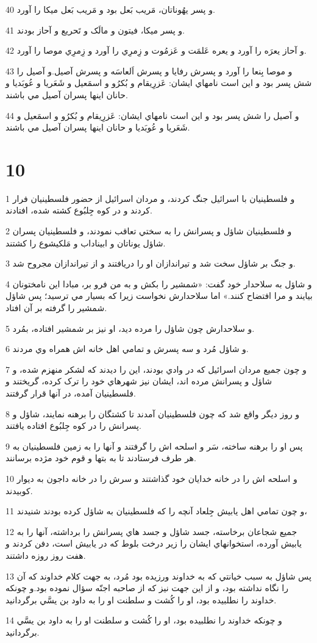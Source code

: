 \par 40 و پسر يهُوناتان، مَريب بَعل بود و مَريب بَعل ميکا را آورد.
\par 41 و پسر ميکا، فيتون و مالَک و تَحريع و آحاز بودند.
\par 42 و آحاز يعرَه را آورد و يعره عَلمَت و عَزمُوت و زِمرِي را آورد و زِمرِي موصا را آورد.
\par 43 و موصا بِنعا را آورد و پسرش رفايا و پسرش اَلعاسَه و پسرش آصيل.و آصيل را شش پسر بود و اين است نامهاي ايشان: عَزرِيقام و بُکرُو و اسمَعيل و شَعَريا و عُوبَديا و حانان اينها پسران آصيل مي باشند.
\par 44 و آصيل را شش پسر بود و اين است نامهاي ايشان: عَزرِيقام و بُکرُو و اسمَعيل و شَعَريا و عُوبَديا و حانان اينها پسران آصيل مي باشند.
 
\chapter{10}

\par 1 و فلسطينيان با اسرائيل جنگ کردند، و مردان اسرائيل از حضور فلسطينيان فرار کردند و در کوه جِلبُوع کشته شده، افتادند.
\par 2 و فلسطينيان شاؤل و پسرانش را به سختي تعاقب نمودند، و فلسطينيان پسران شاؤل يوناتان و ابيناداب و مَلکيشوع را کشتند.
\par 3 و جنگ بر شاؤل سخت شد و تيراندازان او را دريافتند و از تيراندازان مجروح شد.
\par 4 و شاؤل به سلاحدار خود گفت: «شمشير را بکش و به من فرو بر، مبادا اين نامختونان بيايند و مرا افتضاح کنند.» اما سلاحدارش نخواست زيرا که بسيار مي ترسيد؛ پس شاؤل شمشير را گرفته بر آن افتاد.
\par 5 و سلاحدارش چون شاؤل را مرده ديد، او نيز بر شمشير افتاده، بمُرد.
\par 6 و شاؤل مُرد و سه پسرش و تمامي اهل خانه اش همراه وي مردند.
\par 7 و چون جميع مردان اسرائيل که در وادي بودند، اين را ديدند که لشکر منهزم شده، و شاؤل و پسرانش مرده اند، ايشان نيز شهرهاي خود را ترک کرده، گريختند و فلسطينيان آمده، در آنها قرار گرفتند.
\par 8 و روز ديگر واقع شد که چون فلسطينيان آمدند تا کشتگان را برهنه نمايند، شاؤل و پسرانش را در کوه جِلبُوع افتاده يافتند.
\par 9 پس او را برهنه ساخته، سَر و اسلحه اش را گرفتند و آنها را به زمين فلسطينيان به هر طرف فرستادند تا به بتها و قوم خود مژده برسانند.
\par 10 و اسلحه اش را در خانه خدايان خود گذاشتند و سرش را در خانه داجون به ديوار کوبيدند.
\par 11 و چون تمامي اهل يابيش جِلعاد آنچه را که فلسطينيان به شاؤل کرده بودند شنيدند،
\par 12 جميع شجاعان برخاسته، جسد شاؤل و جسد هاي پسرانش را برداشته، آنها را به يابيش آورده، استخوانهاي ايشان را زير درخت بلوط که در يابيش است، دفن کردند و هفت روز روزه داشتند.
\par 13 پس شاؤل به سبب خيانتي که به خداوند ورزيده بود مُرد، به جهت کلام خداوند که آن را نگاه نداشته بود، و از اين جهت نيز که از صاحبه اجنّه سؤال نموده بود.و چونکه خداوند را نطلبيده بود، او را کُشت و سلطنت او را به داود بن يسَّي برگردانيد.
\par 14 و چونکه خداوند را نطلبيده بود، او را کُشت و سلطنت او را به داود بن يسَّي برگردانيد.
 
